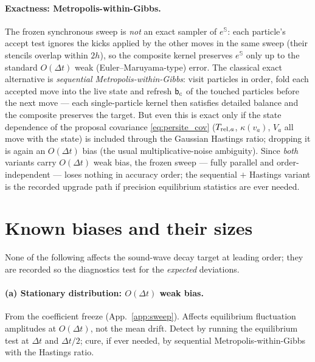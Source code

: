 \documentclass[12pt,aps,preprint,nofootinbib,noshowkeys,noshowpacs,longbibliography,superscriptaddress,tightenlines]{revtex4-2}
\def\Sbb{{\mathbb S}}
\def\bbeta{{\sf b}}
\def\app#1{App.~\ref{#1}}
\begin{document}
\paragraph{Exactness: Metropolis-within-Gibbs.}
The frozen synchronous sweep is \emph{not} an exact sampler of $e^{\Sbb}$:
each particle's accept test ignores the kicks applied by the other moves in the
same sweep (their stencils overlap within $2h$), so the composite kernel
preserves $e^{\Sbb}$ only up to the standard $O(\Delta t)$ weak
(Euler--Maruyama-type) error.  The classical exact alternative is
\emph{sequential Metropolis-within-Gibbs}: visit particles in order, fold each
accepted move into the live state and refresh $\bbeta_c$ of the touched
particles before the next move --- each single-particle kernel then satisfies detailed
balance and the composite preserves the target.  But even this is exact only
if the state dependence of the proposal covariance \eqref{eq:persite_cov}
($T_{{\rm rel},a}$, $\kappa(v_a)$, $V_a$ all move with the state) is included
through the Gaussian Hastings ratio; dropping it is again an $O(\Delta t)$
bias (the usual multiplicative-noise ambiguity).  Since \emph{both} variants
carry $O(\Delta t)$ weak bias, the frozen sweep --- fully parallel and
order-independent --- loses nothing in accuracy order; the sequential $+$
Hastings variant is the recorded upgrade path if precision equilibrium
statistics are ever needed.

\section{Known biases and their sizes}
\label{app:accuracy}

None of the following affects the sound-wave decay target at leading order;
they are recorded so the diagnostics test for the \emph{expected} deviations.

\paragraph{(a) Stationary distribution: $O(\Delta t)$ weak bias.}
From the coefficient freeze (\app{app:sweep}).  Affects equilibrium
fluctuation amplitudes at $O(\Delta t)$, not the mean drift.  Detect by
running the equilibrium test at $\Delta t$ and $\Delta t/2$; cure, if ever
needed, by sequential Metropolis-within-Gibbs with the Hastings ratio.
\end{document}
